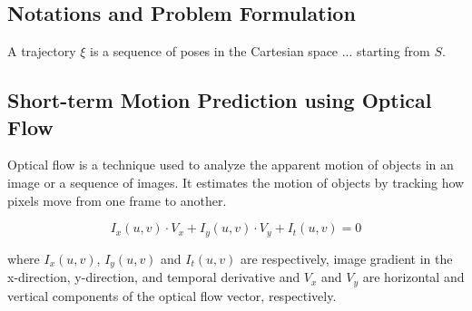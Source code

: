 \subsection{Notations and Problem Formulation}

A trajectory $\xi$ is a sequence of poses in the Cartesian space  ... starting from $S$.




\subsection{Short-term Motion Prediction using Optical Flow}
Optical flow is a technique used to analyze the apparent motion of objects in an image or a sequence of images. It estimates the motion of objects by tracking how pixels move from one frame to another.


\begin{equation}
I_x(u, v) \cdot V_x + I_y(u, v) \cdot V_y + I_t(u, v) = 0 
\end{equation}

\noindent 
where
$I_x(u, v)$, $I_y(u, v)$ and $I_t(u, v)$ are respectively, image gradient in the x-direction, y-direction, and temporal derivative and $V_x$ and $V_y$ are horizontal and vertical components of the optical flow vector, respectively.


